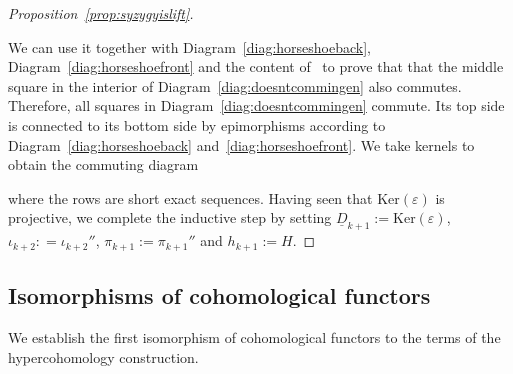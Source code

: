 \documentclass[12pt,a4paper]{article}
\numberwithin{equation}{section}
\theoremstyle{nonumberplain}
\newtheorem{proof}{Proof}
\begin{document}
\begin{proof}[Proposition~\ref{prop:syzygyislift}]
\begin{center}
\end{center}
We can use it together with Diagram~\ref{diag:horseshoeback}, Diagram~\ref{diag:horseshoefront} and the content of~\cite[p.~251]{mac95} to prove that that the middle square in the interior of Diagram~\ref{diag:doesntcommingen} also commutes. Therefore, all squares in Diagram~\ref{diag:doesntcommingen} commute. Its top side is connected to its bottom side by epimorphisms according to Diagram~\ref{diag:horseshoeback} and~\ref{diag:horseshoefront}. We take kernels to obtain the commuting diagram
\begin{center}
\end{center}
where the rows are short exact sequences. Having seen that $\mathrm{Ker}(\varepsilon)$ is projective, we complete the inductive step by setting $\underline{D}_{k+1} := \mathrm{Ker}(\varepsilon)$, $\iota_{k+2} : = \iota_{k+2}''$, $\pi_{k+1} := \pi_{k+1}''$ and $h_{k+1} := H$.
\end{proof}

\subsection{Isomorphisms of cohomological functors}

We establish the first isomorphism of cohomological functors to the terms of the hypercohomology construction.
\end{document}
